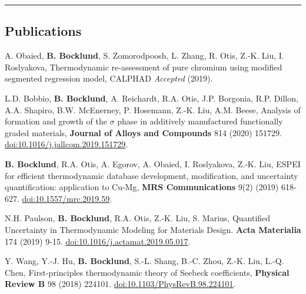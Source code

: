 \documentclass[10pt,letterpaper]{article}
\begin{document}
\hrule
\vspace{-0.6em}
\subsection*{Publications}

\begin{itemize*}


\item A. Obaied, \textbf{B. Bocklund}, S. Zomorodpoosh, L. Zhang, R. Otis, Z.-K. Liu, I. Roslyakova,
  Thermodynamic re-assessment of pure chromium using modified segmented regression model,
  CALPHAD \emph{Accepted} (2019).

\item L.D. Bobbio, \textbf{B. Bocklund}, A. Reichardt, R.A. Otis, J.P. Borgonia, R.P. Dillon, A.A. Shapiro, B.W. McEnerney, P. Hosemann, Z.-K. Liu, A.M. Beese,
Analysis of formation and growth of the $ \sigma $ phase in additively manufactured functionally graded materials,
\textbf{Journal of Alloys and Compounds} 814 (2020) 151729.
\href{https://doi.org/10.1016/j.jallcom.2019.151729}{doi:10.1016/j.jallcom.2019.151729}.

\item \textbf{B. Bocklund}, R.A. Otis, A. Egorov, A. Obaied, I. Roslyakova, Z.-K. Liu,
  ESPEI for efficient thermodynamic database development, modification, and uncertainty quantification: application to Cu-Mg,
  \textbf{MRS Communications} 9(2) (2019) 618-627.
  \href{https://doi.org/10.1557/mrc.2019.59}{doi:10.1557/mrc.2019.59}.

\item N.H. Paulson, \textbf{B. Bocklund}, R.A. Otis, Z.-K. Liu, S. Marius,
  Quantified Uncertainty in Thermodynamic Modeling for Materials Design.
  \textbf{Acta Materialia} 174 (2019) 9-15.
  \href{https://doi.org/10.1016/j.actamat.2019.05.017}{doi:10.1016/j.actamat.2019.05.017}.

\item Y. Wang, Y.-J. Hu, \textbf{B. Bocklund}, S.-L. Shang, B.-C. Zhou, Z.-K. Liu, L.-Q. Chen,
  First-principles thermodynamic theory of Seebeck coefficients,
  \textbf{Physical Review B} 98 (2018) 224101.
  \href{https://doi.org/10.1103/PhysRevB.98.224101}{doi:10.1103/PhysRevB.98.224101}.


\end{itemize*}
\end{document}
